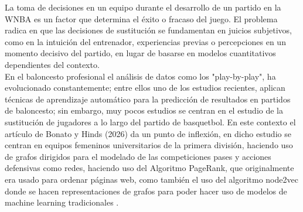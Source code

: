 La toma de decisiones en un equipo durante el desarrollo de un partido en la WNBA es un factor que determina
el éxito o fracaso del juego. El problema radica en que las decisiones de sustitución se fundamentan en juicios
subjetivos, como en la intuición del entrenador, experiencias previas o percepciones en un momento decisivo
del partido, en lugar de basarse en modelos cuantitativos dependientes del contexto.
\\
En el baloncesto profesional el análisis de datos como los "play-by-play", ha evolucionado constantemente;
entre ellos uno de los estudios recientes, aplican técnicas de aprendizaje automático para la predicción de
resultados en partidos de baloncesto; sin embargo, muy pocos estudios se centran en el estudio de la sustitución
de jugadores a lo largo del partido de basquetbol. En este contexto el artículo de Bonato y Hinds (2026) da un
punto de inflexión, en dicho estudio se centran en equipos femeninos universitarios de la primera división,
haciendo uso de grafos dirigidos para el modelado de las competiciones pases y acciones defensivas como
redes, haciendo uso del Algoritmo PageRank, que originalmente era usado para ordenar páginas web, como
también el uso del algoritmo node2vec donde se hacen representaciones de grafos para poder hacer uso de
modelos de machine learning tradicionales \cite{bonato2026networkanalysislinkprediction}.